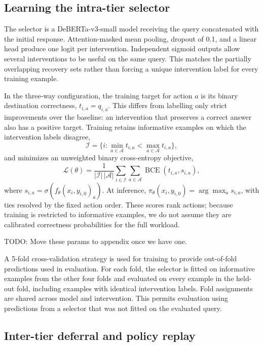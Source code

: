 \documentclass[sigconf]{acmart}
\begin{document}
\subsection{Learning the intra-tier selector}

The selector is a DeBERTa-v3-small model receiving the query concatenated with the initial response. Attention-masked mean pooling, dropout of 0.1, and a linear head produce one logit per intervention. Independent sigmoid outputs allow several interventions to be useful on the same query. This matches the partially overlapping recovery sets rather than forcing a unique intervention label for every training example.

In the three-way configuration, the training target for action $a$ is its binary destination correctness, $t_{i,a}=q_{i,a}$. This differs from labelling only strict improvements over the baseline: an intervention that preserves a correct answer also has a positive target. Training retains informative examples on which the intervention labels disagree,
\begin{equation}
\mathcal{I}=\{i:\min_{a\in\mathcal{A}}t_{i,a}<\max_{a\in\mathcal{A}}t_{i,a}\},
\end{equation}
and minimizes an unweighted binary cross-entropy objective,
\begin{equation}
\mathcal{L}(\theta)=\frac{1}{|\mathcal{I}|\,|\mathcal{A}|}
\sum_{i\in\mathcal{I}}\sum_{a\in\mathcal{A}}
\operatorname{BCE}(t_{i,a},s_{i,a}),
\end{equation}
where $s_{i,a}=\sigma(f_\theta(x_i,y_{i,0})_a)$. At inference, $\pi_\theta(x_i,y_{i,0})=\arg\max_a s_{i,a}$, with ties resolved by the fixed action order. These scores rank actions; because training is restricted to informative examples, we do not assume they are calibrated correctness probabilities for the full workload.

TODO: Move these params to appendix once we have one.

A 5-fold cross-validation strategy is used for training to provide out-of-fold predictions used in evaluation. For each fold, the selector is fitted on informative examples from the other four folds and evaluated on every example in the held-out fold, including examples with identical intervention labels. Fold assignments are shared across model and intervention. This permits evaluation using predictions from a selector that was not fitted on the evaluated query.


\subsection{Inter-tier deferral and policy replay}
\end{document}
